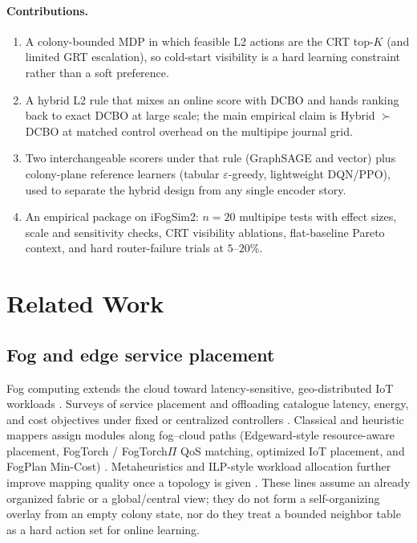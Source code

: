 \documentclass[11pt,a4paper]{article}
\begin{document}
\paragraph{Contributions.}
\begin{enumerate}
\item A colony-bounded MDP in which feasible L2 actions are the CRT top-$K$
(and limited GRT escalation), so cold-start visibility is a hard learning
constraint rather than a soft preference.
\item A hybrid L2 rule that mixes an online score with DCBO and hands ranking
back to exact DCBO at large scale; the main empirical claim is Hybrid $\succ$
DCBO at matched control overhead on the multipipe journal grid.
\item Two interchangeable scorers under that rule (GraphSAGE and vector) plus
colony-plane reference learners (tabular $\varepsilon$-greedy, lightweight
DQN/PPO), used to separate the hybrid design from any single encoder story.
\item An empirical package on iFogSim2: $n{=}20$ multipipe tests with effect
sizes, scale and sensitivity checks, CRT visibility ablations, flat-baseline
Pareto context, and hard router-failure trials at $5$--$20\%$.
\end{enumerate}

\section{Related Work}
\label{sec:rw}

\subsection{Fog and edge service placement}
Fog computing extends the cloud toward latency-sensitive, geo-distributed IoT
workloads \cite{bonomi_mcc2012,chiang_jiot2016,mouradian_comst2018,naha_access2018_fog}.
Surveys of service placement and offloading catalogue latency, energy, and cost
objectives under fixed or centralized controllers
\cite{salaht_csur2020,smolka_computing2022_eval,gasmi_jsup2021_survey,taleb_csur2025_survey,apat_computers2025_survey,yousefpour_sysarc2019}.
Classical and heuristic mappers assign modules along fog--cloud paths
(Edgeward-style resource-aware placement, FogTorch / FogTorch$\Pi$ QoS matching,
optimized IoT placement, and FogPlan Min-Cost)
\cite{taneja_im2017_edgeward,brogi_jiot2017_fogtorch,brogi_icfec2017_fogtorchpi,skarlat_icfec2017,skarlat_soca2017,yousefpour_fogplan_jiot2019}.
Metaheuristics and ILP-style workload allocation further improve mapping quality
once a topology is given
\cite{azimzadeh_cluster2022_genetic,benamer_cluster2024_ga,deng_jiot2016_workload,guerrero_fgcs2019_evolutionary}.
These lines assume an already organized fabric or a global/central view; they do
not form a self-organizing overlay from an empty colony state, nor do they treat
a bounded neighbor table as a hard action set for online learning.
\end{document}
